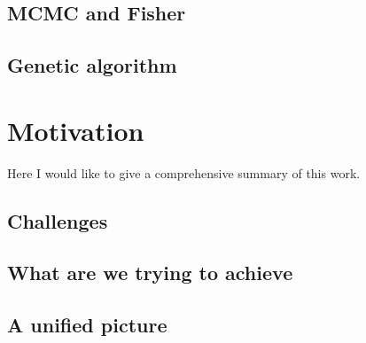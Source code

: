 \subsection{MCMC and Fisher}
\subsection{Genetic algorithm}

\clearpage
\section{Motivation}

Here I would like to give a comprehensive summary of this work.

\subsection{Challenges}
\subsection{What are we trying to achieve}
\subsection{A unified picture}


\clearpage
\cite{2014MNRAS.440.2290M}

\cite{2014MNRAS.439.2651M}

\cite{2014A&A...567A..65B}

\cite{2014MNRAS.445.3382M}

\cite{2014arXiv1410.6826M}

\cite{2015PASJ...67...21M}

\cite{2015arXiv150403388M}





